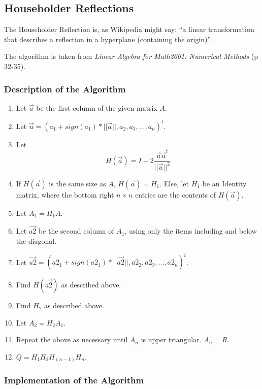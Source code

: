 \documentclass[letterpaper,12pt]{article}
\begin{document}
\subsection{Householder Reflections}

The Householder Reflection is, as Wikipedia might say: ``a linear transformation
that describes a reflection in a hyperplane (containing the origin)''.

The algorithm is taken from \textit{Linear Algebra for Math2601: Numerical Methods}
(p 32-35).

\subsubsection{Description of the Algorithm}

\begin{enumerate}
\item Let $\vec{a}$ be the first column of the given matrix $A$.
\item Let $\vec{u} = (a_1 + sign(a_1) * ||\vec{a}||, a_2, a_3, ..., a_n)^t$.
\item Let \[H(\vec{a}) = I - 2 \frac{\vec{u}\vec{u}^t}{||\vec{u}||^2}\]
\item If $H(\vec{a})$ is the same size as $A$, $H(\vec{a}) = H_1$.
  Else, let $H_1$ be an Identity matrix, where the bottom right $n \times n$
  entries are the contents of $H(\vec{a})$.
\item Let $A_1 = H_1 A$.
\item Let $\vec{a2}$ be the second column of $A_1$, using only the items including
  and below the diagonal.
\item Let $\vec{u2} = (a2_1 + sign(a2_1) * ||\vec{a2}||, a2_2, a2_3, ..., a2_n)^t$.
\item Find $H(\vec{a2})$ as described above.
\item Find $H_2$ as described above.
\item Let $A_2 = H_2 A_1$.
\item Repeat the above as necessary until $A_n$ is upper triangular. $A_n = R$.
\item $Q = H_1 H_2 H_{(n-1)} H_n$.
\end{enumerate}

\subsubsection{Implementation of the Algorithm}
\end{document}

